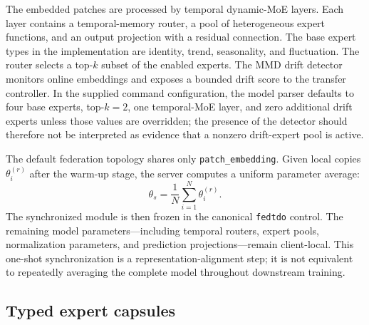 \documentclass{article}
\theoremstyle{definition}
\begin{document}
The embedded patches are processed by temporal dynamic-MoE layers. Each layer contains a temporal-memory router, a pool of heterogeneous expert functions, and an output projection with a residual connection. The base expert types in the implementation are identity, trend, seasonality, and fluctuation. The router selects a top-\(k\) subset of the enabled experts. The MMD drift detector monitors online embeddings and exposes a bounded drift score to the transfer controller. In the supplied command configuration, the model parser defaults to four base experts, top-\(k=2\), one temporal-MoE layer, and zero additional drift experts unless those values are overridden; the presence of the detector should therefore not be interpreted as evidence that a nonzero drift-expert pool is active.

The default federation topology shares only \texttt{patch\_embedding}. Given local copies \(\theta_i^{(r)}\) after the warm-up stage, the server computes a uniform parameter average:
\begin{equation}
\theta_s =
 \frac{1}{N}\sum_{i=1}^{N}\theta_i^{(r)}.
 \label{eq:fedavg}
\end{equation}
The synchronized module is then frozen in the canonical \texttt{fedtdo} control. The remaining model parameters---including temporal routers, expert pools, normalization parameters, and prediction projections---remain client-local. This one-shot synchronization is a representation-alignment step; it is not equivalent to repeatedly averaging the complete model throughout downstream training.

\subsection{Typed expert capsules}
\end{document}
